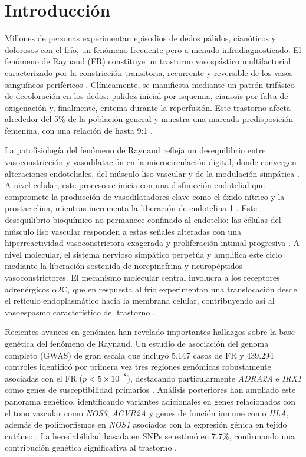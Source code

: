 \section{Introducción}

Millones de personas experimentan episodios de dedos pálidos, cianóticos y dolorosos con el frío, un fenómeno frecuente pero a menudo infradiagnosticado. El fenómeno de Raynaud (FR) constituye un trastorno vasospástico multifactorial caracterizado por la constricción transitoria, recurrente y reversible de los vasos sanguíneos periféricos \cite{Nawaz2022, Herrick2012}. Clínicamente, se manifiesta mediante un patrón trifásico de decoloración en los dedos: palidez inicial por isquemia, cianosis por falta de oxigenación y, finalmente, eritema durante la reperfusión. Este trastorno afecta alrededor del 5\% de la población general y muestra una marcada predisposición femenina, con una relación de hasta 9:1 \cite{Medscape2024, Musa2023, Garner2015, Ingegnoli2022}.  

La patofisiología del fenómeno de Raynaud refleja un desequilibrio entre vasoconstricción y vasodilatación en la microcirculación digital, donde convergen alteraciones endoteliales, del músculo liso vascular y de la modulación simpática \cite{Herrick2005, Flavahan2015}. A nivel celular, este proceso se inicia con una disfuncción endotelial que compromete la producción de vasodilatadores clave como el óxido nítrico y la prostaciclina, mientras incrementa la liberación de endotelina-1 \cite{Flavahan2008, Blann1993, Freedman1999}. Este desequilibrio bioquímico no permanece confinado al endotelio: las células del músculo liso vascular responden a estas señales alteradas con una hiperreactividad vasoconstrictora exagerada y proliferación intimal progresiva \cite{Fardoun2016, Cooke2004}. A nivel molecular, el sistema nervioso simpático perpetúa y amplifica este ciclo mediante la liberación sostenida de norepinefrina y neuropéptidos vasoconstrictores. El mecanismo molecular central involucra a los receptores adrenérgicos $\alpha$2C, que en respuesta al frío experimentan una translocación desde el retículo endoplasmático hacia la membrana celular, contribuyendo así al vasoespasmo característico del trastorno \cite{Fardoun2016, Flavahan2008, Chotani2000}. 

Recientes avances en genómica han revelado importantes hallazgos sobre la base genética del fenómeno de Raynaud. Un estudio de asociación del genoma completo (GWAS) de gran escala que incluyó 5.147 casos de FR y 439.294 controles identificó por primera vez tres regiones genómicas robustamente asociadas con el FR ($p < 5 \times 10^{-8}$), destacando particularmente \textit{ADRA2A} e \textit{IRX1} como genes de susceptibilidad primarios \cite{Hartmann2023}. Análisis posteriores han ampliado este panorama genético, identificando variantes adicionales en genes relacionados con el tono vascular como \textit{NOS3}, \textit{ACVR2A} y genes de función inmune como \textit{HLA}, además de polimorfismos en \textit{NOS1} asociados con la expresión génica en tejido cutáneo \cite{deAlmeidaTervi2024, Smolina2018, Hughes2017}. La heredabilidad basada en SNPs se estimó en 7.7\%, confirmando una contribución genética significativa al trastorno \cite{Hartmann2023, ofLondon2023}.

